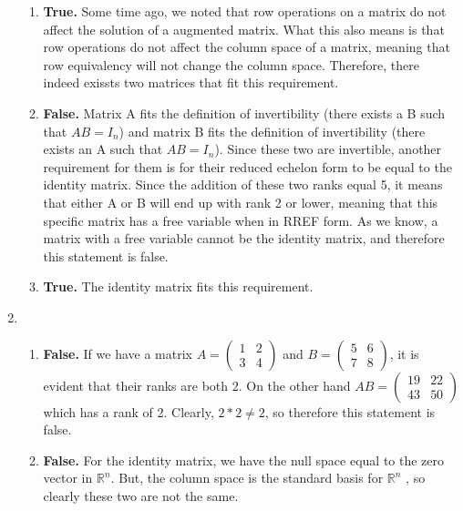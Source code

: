 \documentclass{article}
\begin{document}
\begin{enumerate}
\begin{enumerate}
\item \textbf{True.} Some time ago, we noted that row operations on a matrix do not affect the solution of a augmented matrix. What this also means is that row operations do not affect the column space of a matrix, meaning that row equivalency will not change the column space. Therefore, there indeed exissts two matrices that fit this requirement.

\item \textbf{False.} Matrix A fits the definition of invertibility (there exists a B such that $AB = I_n$) and matrix B fits the definition of invertibility (there exists an A such that $AB = I_n$). Since these two are invertible, another requirement for them is for their reduced echelon form to be equal to the identity matrix. Since the addition of these two ranks equal 5, it means that either A or B will end up with rank 2 or lower, meaning that this specific matrix has a free variable when in RREF form. As we know, a matrix with a free variable cannot be the identity matrix, and therefore this statement is false.

\item \textbf{True.} The identity matrix fits this requirement.

\end{enumerate}

\item

\begin{enumerate}

\item \textbf{False.} If we have a matrix $A = \left(\begin{array}{cc} 1 & 2 \\ 3 & 4 \end{array}\right)$ and $B = \left(\begin{array}{cc} 5 & 6 \\ 7 & 8 \end{array}\right)$, it is evident that their ranks are both 2. On the other hand $AB = \left(\begin{array}{cc} 19 & 22 \\ 43 & 50 \end{array}\right)$ which has a rank of 2. Clearly, $2 * 2 \neq 2$, so therefore this statement is false.

\item \textbf{False.} For the identity matrix, we have the null space equal to the zero vector in $\mathbb{R}^n$. But, the column space is the standard basis for $\mathbb{R}^n$ , so clearly these two are not the same.


\end{enumerate}
\end{enumerate}
\end{document}
